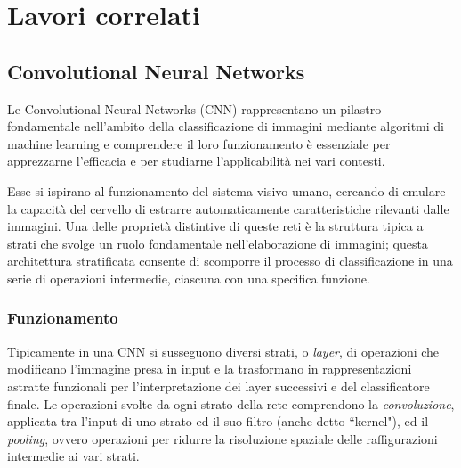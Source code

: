 \chapter{Lavori correlati}
\label{cha:intro}

\section{Convolutional Neural Networks} %

Le Convolutional Neural Networks (CNN) \cite{deeplearning} rappresentano un pilastro fondamentale nell'ambito della classificazione di immagini mediante algoritmi di machine learning e comprendere il loro funzionamento è essenziale per apprezzarne l'efficacia e per studiarne l'applicabilità nei vari contesti.


Esse si ispirano al funzionamento del sistema visivo umano, cercando di emulare la capacità del cervello di estrarre automaticamente caratteristiche rilevanti dalle immagini. Una delle proprietà distintive di queste reti è la struttura tipica a strati che svolge un ruolo fondamentale nell'elaborazione di immagini; questa architettura stratificata consente di scomporre il processo di classificazione in una serie di operazioni intermedie, ciascuna con una specifica funzione.

\subsection{Funzionamento}
\label{sec:cnnfunc}
Tipicamente in una CNN si susseguono diversi strati, o \textit{layer}, di operazioni che modificano l'immagine presa in input e la trasformano in rappresentazioni astratte funzionali per l'interpretazione dei layer successivi e del classificatore finale. Le operazioni svolte da ogni strato della rete comprendono la \textit{convoluzione}, applicata tra l'input di uno strato ed il suo filtro (anche detto ``kernel"), ed il \textit{pooling}, ovvero operazioni per ridurre la risoluzione spaziale delle raffigurazioni intermedie ai vari strati.

